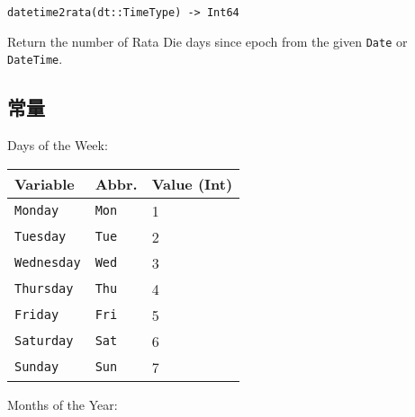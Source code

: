 \begin{adjustwidth}{2em}{0pt}


\begin{verbatim}
datetime2rata(dt::TimeType) -> Int64
\end{verbatim}

Return the number of Rata Die days since epoch from the given \texttt{Date} or \texttt{DateTime}.



\end{adjustwidth}

\hypertarget{5407065244463689569}{}


\subsection{常量}



Days of the Week:




\begin{table}[h]

\begin{tabulary}{\linewidth}{|L|L|L|}
\hline
Variable & Abbr. & Value (Int) \\
\hline
\texttt{Monday} & \texttt{Mon} & 1 \\
\hline
\texttt{Tuesday} & \texttt{Tue} & 2 \\
\hline
\texttt{Wednesday} & \texttt{Wed} & 3 \\
\hline
\texttt{Thursday} & \texttt{Thu} & 4 \\
\hline
\texttt{Friday} & \texttt{Fri} & 5 \\
\hline
\texttt{Saturday} & \texttt{Sat} & 6 \\
\hline
\texttt{Sunday} & \texttt{Sun} & 7 \\
\hline
\end{tabulary}

\end{table}



Months of the Year:




